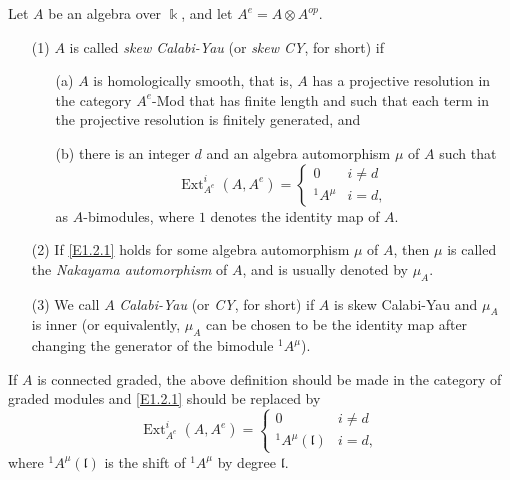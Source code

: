 \begin{definition}
\label{xxdef1.2}
Let $A$ be an algebra over $\Bbbk$, and let $A^e = A \otimes A^{op}$.
\begin{enumerate}
\item[(1)]
$A$ is called {\it skew Calabi-Yau} (or {\it skew CY}, for short) if
\begin{enumerate}
\item[(a)]
$A$ is homologically smooth, that is, $A$ has a projective resolution 
in the category $A^e$-Mod that has finite length and such that each 
term in the projective resolution is finitely generated, and
\item[(b)]
there is an integer $d$ and an algebra automorphism $\mu$ of $A$ 
such that
\begin{equation}
\label{E1.2.1}\tag{E1.2.1}
\operatorname{Ext}^i_{A^e}(A,A^e)=\begin{cases} 0 & i\neq d\\
{^1 A^\mu} & i=d,\end{cases}
\end{equation}
as $A$-bimodules, where $1$ denotes the identity map of $A$.
\end{enumerate}
\item[(2)]
If \eqref{E1.2.1} holds for some algebra automorphism $\mu$ 
of $A$, then $\mu$ is called the {\it Nakayama automorphism} 
of $A$, and is usually denoted by $\mu_A$. 
\item[(3)]
We call $A$ {\it Calabi-Yau} (or {\it CY}, for short) if 
$A$ is skew Calabi-Yau and $\mu_A$ is inner (or equivalently, 
$\mu_A$ can be chosen to be the identity map after changing 
the generator of the bimodule ${^1 A^\mu}$).
\end{enumerate}
\end{definition}

If $A$ is connected graded, the above definition should be made 
in the category of graded modules and \eqref{E1.2.1}
should be replaced by
\begin{equation}
\label{E1.2.2}\tag{E1.2.2}
\operatorname{Ext}^i_{A^e}(A,A^e)=\begin{cases} 0 & i\neq d\\
{^1 A^\mu}({\mathfrak l}) & i=d,\end{cases}
\end{equation}
where ${^1 A^\mu}({\mathfrak l})$ is the shift of ${^1 A^\mu}$ by degree ${\mathfrak l}$.


